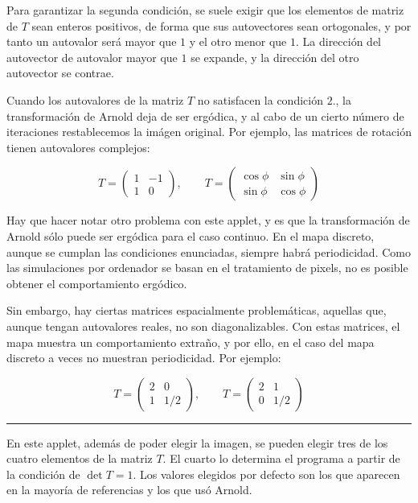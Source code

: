 \documentclass[11pt, a4paper]{article} %
\theoremstyle{named}
\begin{document}
Para garantizar la segunda condición, se suele exigir que los elementos de matriz de $T$ sean enteros positivos, de forma que sus autovectores sean ortogonales, y por tanto un autovalor será mayor que $1$ y el otro menor que $1$. La dirección del autovector de autovalor mayor que $1$ se expande, y la dirección del otro autovector se contrae.

Cuando los autovalores de la matriz $T$ no satisfacen la condición $2.$, la transformación de Arnold deja de ser ergódica, y al cabo de un cierto número de iteraciones restablecemos la imágen original. Por ejemplo, las matrices de rotación tienen autovalores complejos:

$$
T = \begin{pmatrix} 1 & -1 \\ 1 & 0
\end{pmatrix}, \qquad
T = \begin{pmatrix} \cos\phi & \sin\phi \\ \sin\phi & \cos\phi
\end{pmatrix}
$$

Hay que hacer notar otro problema con este applet, y es que la transformación de Arnold sólo puede ser ergódica para el caso continuo. En el mapa discreto, aunque se cumplan las condiciones enunciadas, siempre habrá periodicidad. Como las simulaciones por ordenador se basan en el tratamiento de pixels, no es posible obtener el comportamiento ergódico.

Sin embargo, hay ciertas matrices espacialmente problemáticas, aquellas que, aunque tengan autovalores reales, no son diagonalizables. Con estas matrices, el mapa muestra un comportamiento extraño, y por ello, en el caso del mapa discreto a veces no muestran periodicidad. Por ejemplo:

$$
T = \begin{pmatrix} 2 & 0 \\ 1 & 1/2
\end{pmatrix}, \qquad
T = \begin{pmatrix} 2 & 1 \\ 0 & 1/2
\end{pmatrix}
$$

\noindent\rule{\linewidth}{0.4pt}

En este applet, además de poder elegir la imagen, se pueden elegir tres de los cuatro elementos de la matriz $T$. El cuarto lo determina el programa a partir de la condición de $\det{T} = 1$. Los valores elegidos por defecto son los que aparecen en la mayoría de referencias y los que usó Arnold.
\end{document}
